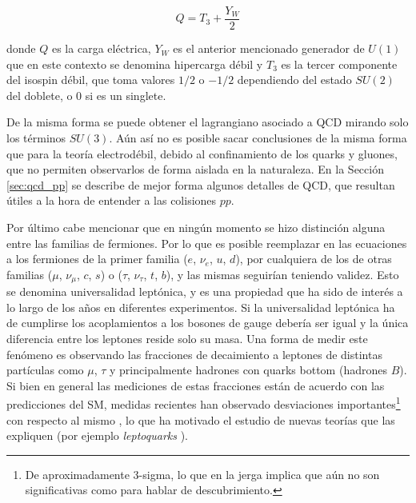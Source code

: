 \begin{equation}
Q = T_3 + \frac{Y_W}{2} 
\end{equation}

\noindent
donde $Q$ es la carga eléctrica, $Y_W$ es el anterior mencionado generador de $U(1)$ que en este contexto se denomina hipercarga débil y $T_3$ es la tercer componente del isospin débil, que toma valores $1/2$ o $-1/2$ dependiendo del estado $SU(2)$ del doblete, o $0$ si es un singlete.

De la misma forma se puede obtener el lagrangiano asociado a QCD mirando solo los términos $SU(3)$. Aún así no es posible sacar conclusiones de la misma forma que para la teoría electrodébil, debido al confinamiento de los quarks y gluones, que no permiten observarlos de forma aislada en la naturaleza. En la Sección \ref{sec:qcd_pp} se describe de mejor forma algunos detalles de QCD, que resultan útiles a la hora de entender a las colisiones $pp$.

Por último cabe mencionar que en ningún momento se hizo distinción alguna entre las familias de fermiones. Por lo que es posible reemplazar en las ecuaciones a los fermiones de la primer familia ($e$, $\nu_e$, $u$, $d$), por cualquiera de los de otras familias ($\mu$, $\nu_\mu$, $c$, $s$) o ($\tau$, $\nu_\tau$, $t$, $b$), y las mismas seguirían teniendo validez.
Esto se denomina universalidad leptónica, y es una propiedad que ha sido de interés a lo largo de los años en diferentes experimentos. Si la universalidad leptónica ha de cumplirse los acoplamientos a los bosones de gauge debería ser igual y la única diferencia entre los leptones reside solo su masa. Una forma de medir este fenómeno es observando las fracciones de decaimiento a leptones de distintas partículas como $\mu$, $\tau$ y principalmente hadrones con quarks bottom (hadrones $B$). Si bien en general las mediciones de estas fracciones están de acuerdo con las predicciones del SM, medidas recientes han observado desviaciones importantes\footnote{De aproximadamente 3-sigma, lo que en la jerga implica que aún no son significativas como para hablar de descubrimiento.} con respecto al mismo \cite{lepton_uni_1, lepton_uni_2}, lo que ha motivado el estudio de nuevas teorías que las expliquen (por ejemplo \textit{leptoquarks} \cite{leptoquark_1, Okumura:2744026}).


